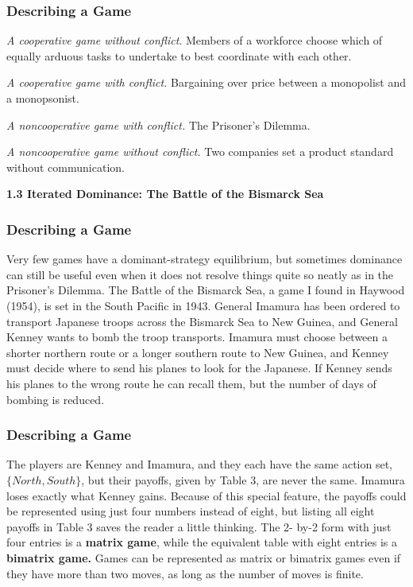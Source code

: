  \begin{frame}[fragile]\frametitle{Describing a Game}
 
 {\it A cooperative game without conflict}. Members of a workforce
choose which of equally arduous tasks to undertake to best coordinate with each
other.

 {\it A cooperative game with conflict.} Bargaining over  price between
a monopolist and a monopsonist.

 {\it A noncooperative game with conflict.} The   Prisoner's Dilemma.

 {\it A noncooperative game without conflict.} Two companies set a
product standard without communication.

  
  {\bf 1.3  Iterated Dominance:  The Battle of the Bismarck Sea }
\end{frame}


 \begin{frame}[fragile]\frametitle{Describing a Game}
 
 Very few games have a dominant-strategy equilibrium, but sometimes dominance
can still be useful even when it does not resolve things quite so neatly as in
the Prisoner's Dilemma. {The  Battle of the Bismarck Sea}, a game I found in
Haywood (1954),   is set in the South Pacific in 1943. General  Imamura has been
ordered to transport Japanese troops across the Bismarck Sea to New Guinea, and
General Kenney wants to bomb the troop transports.  Imamura must choose between
a shorter northern route or a longer southern route to New Guinea, and Kenney
must decide where to send his planes to look for the Japanese. If Kenney sends
his planes to the wrong route he can recall them, but the number of days of
bombing is reduced.
\end{frame}

 \begin{frame}[fragile]\frametitle{Describing a Game}
 The players are Kenney and Imamura, and they each have the same action set,
$\{North, South\}$, but their payoffs, given by Table 3, are never the same.
Imamura loses exactly what Kenney gains. Because of this special feature, the
payoffs could be represented using just four numbers instead of eight, but
listing all eight payoffs in Table  3 saves the reader a little thinking. The 2-
by-2 form with just four entries is a  {\bf matrix game}, while the equivalent
table with eight entries is a {\bf bimatrix game.} Games can be represented as
matrix or bimatrix games even if they have more than two moves, as long as the
number of moves is finite.
\end{frame}

